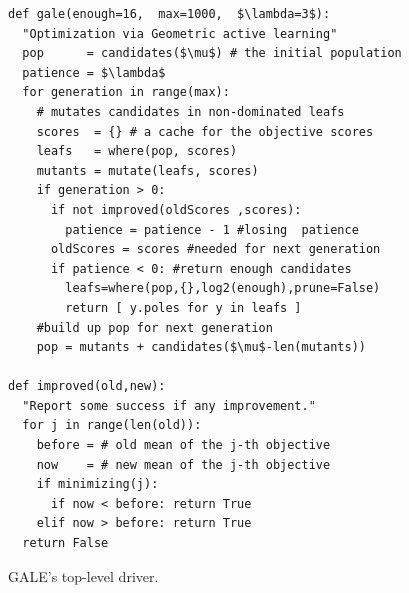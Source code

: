 \documentclass[10pt,journal,compsoc]{IEEEtran}
\begin{document}
\begin{figure}[!t]
\begin{lstlisting}[mathescape,frame=r,numbers=right]
def gale(enough=16,  max=1000,  $\lambda=3$):
  "Optimization via Geometric active learning"
  pop      = candidates($\mu$) # the initial population
  patience = $\lambda$
  for generation in range(max):
    # mutates candidates in non-dominated leafs
    scores  = {} # a cache for the objective scores 
    leafs   = where(pop, scores)
    mutants = mutate(leafs, scores)
    if generation > 0:  
      if not improved(oldScores ,scores):
        patience = patience - 1 #losing  patience
      oldScores = scores #needed for next generation
      if patience < 0: #return enough candidates
        leafs=where(pop,{},log2(enough),prune=False)
        return [ y.poles for y in leafs ] 
    #build up pop for next generation
    pop = mutants + candidates($\mu$-len(mutants))   

def improved(old,new):
  "Report some success if any improvement."
  for j in range(len(old)):
    before = # old mean of the j-th objective
    now    = # new mean of the j-th objective
    if minimizing(j):
      if now < before: return True
    elif now > before: return True
  return False 
\end{lstlisting}

\caption{GALE's top-level driver.}
\label{fig:galeCode}   
\end{figure}
\end{document}
